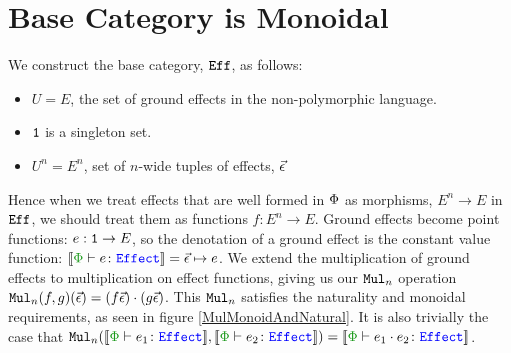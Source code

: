 \documentclass{report}
\begin{document}
\section{Base Category is Monoidal}

We construct the base category, $\Eff$, as follows:

\begin{itemize}
    \item $U = E$, the set of ground effects in the non-polymorphic language.
    \item $\1$ is a singleton set.
    \item $U^n = E^n$, set of $n$-wide tuples of effects, $\vec{\e}$
\end{itemize}

Hence when we treat effects that are well formed in $\P$ as morphisms, $E^n \rightarrow E$ in $\Eff$, we should treat them as functions $f: E^n \rightarrow E$. Ground effects become point functions: $e: \1 \rightarrow E$, so the denotation of a ground effect is the constant value function: $\deno{\typerelation{\P}{e}{\effect}} = \ev \mapsto e$. We extend the multiplication of ground effects to multiplication on effect functions, giving us our $\Mul_n$ operation $\Mul_n(f, g)(\ev) = (f\ev)\dot(g\ev)$. This $\Mul_n$ satisfies the naturality and monoidal requirements, as seen in figure \ref{MulMonoidAndNatural}. It is also trivially the case that $\Mul_n(\deno{\typerelation{\P}{e_1}{\effect}}, \deno{\typerelation{\P}{e_2}{\effect}}) = \deno{\typerelation{\P}{e_1\dot e_2}{\effect}}$.
\end{document}
